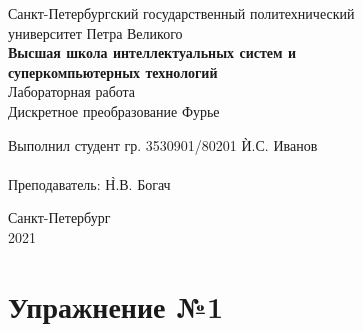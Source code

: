\documentclass[a4paper, 14pt]{extarticle}
\begin{document}
    \begin{center}
        \begin{center}
            \hfill \break
            \normalsize{Санкт-Петербургский государственный политехнический}\\
            \normalsize{университет Петра Великого}\\
            \hfill \break
            \normalsize{\textbf{Высшая школа интеллектуальных систем и}}\\
            \normalsize{\textbf{суперкомпьютерных технологий}}\\
            \hfill \break
            \hfill \break
            \hfill \break
            \normalsize{Лабораторная работа}\\
            \hfill \break
            \normalsize{\LARGE Дискретное преобразование Фурье}\\
        \end{center}
        \hfill \break
        \hfill \break
        \hfill \break
        \hfill \break
        \hfill \break
        \hfill \break
        \hfill \break
        \hfill \break
        \hfill \break
        \hfill \break
        \begin{tabbing}
            Выполнил студент гр. 3530901/80201 \`И.С. Иванов\\
            \\
            Преподаватель: \`Н.В. Богач\\
        \end{tabbing}
        \hfill \break
        \hfill \break
        \hfill \break
        \hfill \break
        \begin{center}
            Санкт-Петербург\\
            2021
        \end{center}
        \thispagestyle{empty}
    \end{center}

    \newpage
    \tableofcontents

    \newpage
    \listoffigures

    \newpage
    \lstlistoflistings

    \newpage


    \section{Упражнение №1}
    \label{sec:1}
\end{document}
